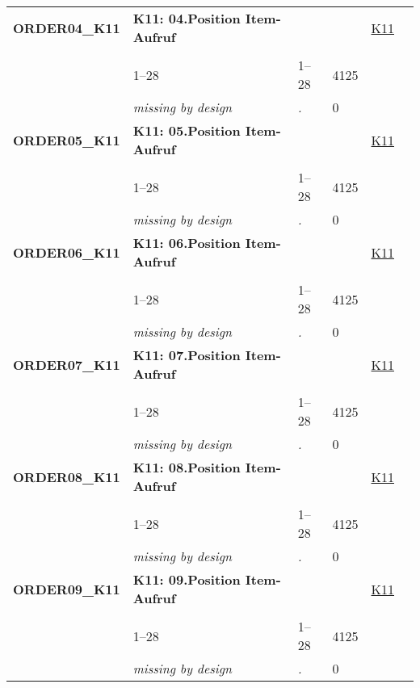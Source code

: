 \begin{longtable}{| L{2.45cm} | L{6cm} | C{1.5cm} | R{1cm} | C{2.25cm} | C{2.25cm} |}
   \midrule
\textbf{ORDER04\_K11}\label{var:ORDER04:K11} & \textbf{K11: 04.Position Item-Aufruf} &  &  & \hyperref[K11]{K11} & \hyperref[var:suf:]{} \\ 
   &  &  &  &  &  \\ 
   & 1--28 & 1--28 & 4125 &  &  \\ 
   & \textit{missing by design} & \textit{.} & 0 &  &  \\ 
   \midrule
\textbf{ORDER05\_K11}\label{var:ORDER05:K11} & \textbf{K11: 05.Position Item-Aufruf} &  &  & \hyperref[K11]{K11} & \hyperref[var:suf:]{} \\ 
   &  &  &  &  &  \\ 
   & 1--28 & 1--28 & 4125 &  &  \\ 
   & \textit{missing by design} & \textit{.} & 0 &  &  \\ 
   \midrule
\textbf{ORDER06\_K11}\label{var:ORDER06:K11} & \textbf{K11: 06.Position Item-Aufruf} &  &  & \hyperref[K11]{K11} & \hyperref[var:suf:]{} \\ 
   &  &  &  &  &  \\ 
   & 1--28 & 1--28 & 4125 &  &  \\ 
   & \textit{missing by design} & \textit{.} & 0 &  &  \\ 
   \midrule
\textbf{ORDER07\_K11}\label{var:ORDER07:K11} & \textbf{K11: 07.Position Item-Aufruf} &  &  & \hyperref[K11]{K11} & \hyperref[var:suf:]{} \\ 
   &  &  &  &  &  \\ 
   & 1--28 & 1--28 & 4125 &  &  \\ 
   & \textit{missing by design} & \textit{.} & 0 &  &  \\ 
   \midrule
\textbf{ORDER08\_K11}\label{var:ORDER08:K11} & \textbf{K11: 08.Position Item-Aufruf} &  &  & \hyperref[K11]{K11} & \hyperref[var:suf:]{} \\ 
   &  &  &  &  &  \\ 
   & 1--28 & 1--28 & 4125 &  &  \\ 
   & \textit{missing by design} & \textit{.} & 0 &  &  \\ 
   \midrule
\textbf{ORDER09\_K11}\label{var:ORDER09:K11} & \textbf{K11: 09.Position Item-Aufruf} &  &  & \hyperref[K11]{K11} & \hyperref[var:suf:]{} \\ 
   &  &  &  &  &  \\ 
   & 1--28 & 1--28 & 4125 &  &  \\ 
   & \textit{missing by design} & \textit{.} & 0 &  &  \\ 

\end{longtable}
